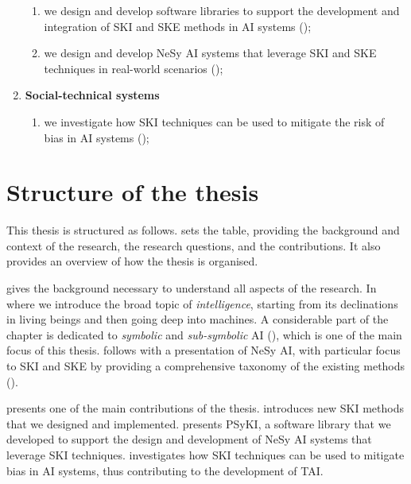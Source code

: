 \begin{refsection}
\begin{enumerate}[label=\emph{(\roman*)}]
    \begin{enumerate}[label=\emph{(\arabic*)},resume]
        \item we design and develop software libraries to support the development and integration of \gls{SKI} and \gls{SKE} methods in \gls{AI} systems ();
        \item we design and develop \gls{NeSy} \gls{AI} systems that leverage \gls{SKI} and \gls{SKE} techniques in real-world scenarios ();
    \end{enumerate}
    \item \textbf{Social-technical systems}

    \begin{enumerate}[label=\emph{(\arabic*)},resume]
        \item we investigate how \gls{SKI} techniques can be used to mitigate the risk of bias in \gls{AI} systems ();
    \end{enumerate}
\end{enumerate}


\section{Structure of the thesis}
\label{sec:structure-of-the-thesis}
%
This thesis is structured as follows.
%
 sets the table, providing the background and context of the research, the research questions, and the contributions.
%
It also provides an overview of how the thesis is organised.


 gives the background necessary to understand all aspects of the research.
%
In  where we introduce the broad topic of \emph{intelligence}, starting from its declinations in living beings and then going deep into machines.
%
A considerable part of the chapter is dedicated to \emph{symbolic} and \emph{sub-symbolic} \gls{AI} (), which is one of the main focus of this thesis.
%
 follows with a presentation of \gls{NeSy} \gls{AI}, with particular focus to \gls{SKI} and \gls{SKE} by providing a comprehensive taxonomy of the existing methods ().


 presents one of the main contributions of the thesis.
%
 introduces new \gls{SKI} methods that we designed and implemented.
%
 presents \gls{PSyKI}, a software library that we developed to support the design and development of \gls{NeSy} \gls{AI} systems that leverage \gls{SKI} techniques.
%
 investigates how \gls{SKI} techniques can be used to mitigate bias in \gls{AI} systems, thus contributing to the development of \gls{TAI}.



\end{refsection}
